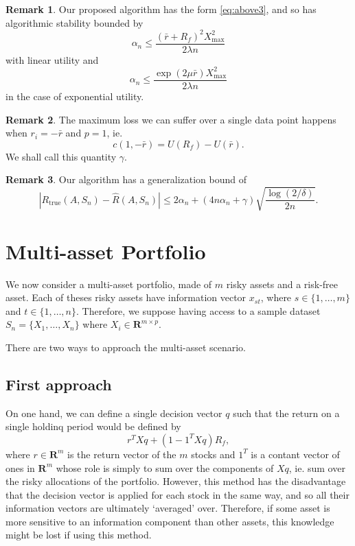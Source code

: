 \documentclass[11pt]{article}
\newcommand{\real}{\bm R}
\theoremstyle{plain}
\theoremstyle{definition}
\newtheorem*{rem}{Remark}
\begin{document}
\begin{rem}
  Our proposed algorithm has the form \eqref{eq:above3}, and so has algorithmic stability
  bounded by
  \begin{equation}
    \alpha_n \leq \frac{(\bar r+R_f)^2X^2_{\max}}{2\lambda n}
  \end{equation}
  with linear utility and
  \begin{equation}
    \alpha_n \leq \frac{\exp(2\mu\bar r)X^2_{\max}}{2\lambda n}
  \end{equation}
  in the case of exponential utility.
\end{rem}

\begin{rem}
  The maximum loss we can suffer over a single data point happens when $r_i=-\bar r$ and
  $p=1$, ie.
  \begin{equation}
    c(1,-\bar r) = U(R_f) - U(\bar r).
  \end{equation}
  We shall call this quantity $\gamma$.
\end{rem}

\begin{rem}
  Our algorithm has a generalization bound of
  \begin{equation}
    |R_{\text{true}}(A,S_n) - \hat R(A,S_n)| \leq 2\alpha_n + (4n\alpha_n + \gamma) \sqrt{\frac{\log(2/\delta)}{2n}}.
  \end{equation}
\end{rem}


\section{Multi-asset Portfolio}

We now consider a multi-asset portfolio, made of $m$ risky assets and a risk-free
asset. Each of theses risky assets have information vector $x_{st}$, where
$s\in\{1,\ldots,m\}$ and $t\in\{1,\ldots,n\}$. Therefore, we suppose having access to a
sample dataset $S_n = \{X_1,\ldots,X_n\}$ where $X_i\in\real^{m\times p}$.

There are two ways to approach the multi-asset scenario. 


\subsection{First approach}

On one hand, we can define a single decision vector $q$ such that the return on a single
holdinq period would be defined by
\begin{equation}
  r^{T}Xq + (1 - 1^{T}Xq)R_f,
\end{equation}
where $r\in\real^{m}$ is the return vector of the $m$ stocks and $1^T$ is a contant vector
of ones in $\real^m$ whose role is simply to sum over the components of $Xq$, ie. sum over
the risky allocations of the portfolio. However, this method has the disadvantage that the
decision vector is applied for each stock in the same way, and so all their information
vectors are ultimately `averaged' over. Therefore, if some asset is more sensitive to an
information component than other assets, this knowledge might be lost if using this
method. 
\end{document}
